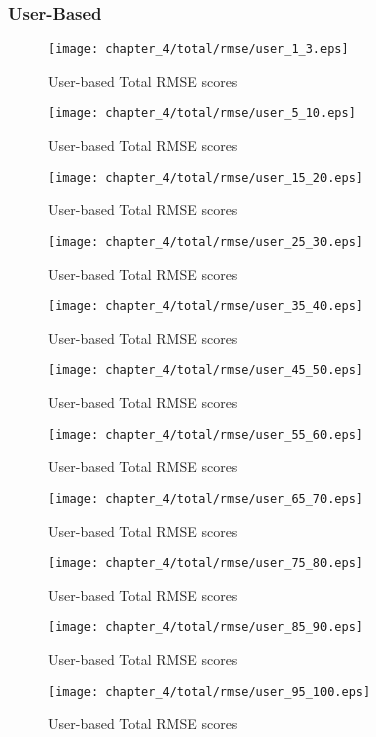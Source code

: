 \subsubsection{User-Based}

\begin{figure}[H]
\centering
\texttt{[image: chapter\_4/total/rmse/user\_1\_3.eps]}
\caption{User-based Total RMSE scores}
\end{figure}

\begin{figure}[H]
\centering
\texttt{[image: chapter\_4/total/rmse/user\_5\_10.eps]}
\caption{User-based Total RMSE scores}
\end{figure}

\begin{figure}[H]
\centering
\texttt{[image: chapter\_4/total/rmse/user\_15\_20.eps]}
\caption{User-based Total RMSE scores}
\end{figure}

\begin{figure}[H]
\centering
\texttt{[image: chapter\_4/total/rmse/user\_25\_30.eps]}
\caption{User-based Total RMSE scores}
\end{figure}

\begin{figure}[H]
\centering
\texttt{[image: chapter\_4/total/rmse/user\_35\_40.eps]}
\caption{User-based Total RMSE scores}
\end{figure}

\begin{figure}[H]
\centering
\texttt{[image: chapter\_4/total/rmse/user\_45\_50.eps]}
\caption{User-based Total RMSE scores}
\end{figure}

\begin{figure}[H]
\centering
\texttt{[image: chapter\_4/total/rmse/user\_55\_60.eps]}
\caption{User-based Total RMSE scores}
\end{figure}

\begin{figure}[H]
\centering
\texttt{[image: chapter\_4/total/rmse/user\_65\_70.eps]}
\caption{User-based Total RMSE scores}
\end{figure}

\begin{figure}[H]
\centering
\texttt{[image: chapter\_4/total/rmse/user\_75\_80.eps]}
\caption{User-based Total RMSE scores}
\end{figure}

\begin{figure}[H]
\centering
\texttt{[image: chapter\_4/total/rmse/user\_85\_90.eps]}
\caption{User-based Total RMSE scores}
\end{figure}

\begin{figure}[H]
\centering
\texttt{[image: chapter\_4/total/rmse/user\_95\_100.eps]}
\caption{User-based Total RMSE scores}
\end{figure}
